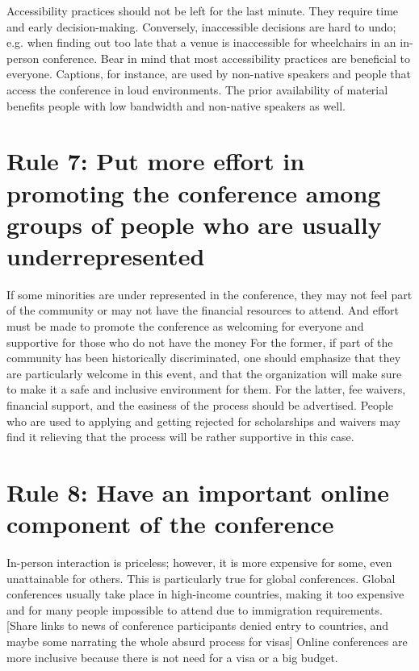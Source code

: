 \documentclass[10pt,letterpaper]{article}
\begin{document}
Accessibility practices should not be left for the last minute. They require time and early decision-making. Conversely, inaccessible decisions are hard to undo; e.g. when finding out too late that a venue is inaccessible for wheelchairs in an in-person conference. 
Bear in mind that most accessibility practices are beneficial to everyone. Captions, for instance, are used by non-native speakers and people that access the conference in loud environments. The prior availability of material benefits people with low bandwidth and non-native speakers as well.

\section*{Rule 7: Put more effort in promoting the conference among groups of people who are usually underrepresented}

If some minorities are under represented in the conference, they may not feel part of the community or may not have the financial resources to attend. And effort must be made to promote the conference as welcoming for everyone and supportive for those who do not have the money %
For the former, if part of the community has been historically discriminated, one should emphasize that they are particularly welcome in this event, and that the organization will make sure to make it a safe and inclusive environment for them. For the latter, fee waivers, financial support, and the easiness of the process should be advertised. People who are used to applying and getting rejected for scholarships and waivers may find it relieving that the process will be rather supportive in this case. 


\section*{Rule 8: Have an important online component of the conference} 

In-person interaction is priceless; however, it is more expensive for some, even unattainable for others. This is particularly true for global conferences. Global conferences usually take place in high-income countries, making it too expensive and for many people impossible to attend due to immigration requirements. [Share links to news of conference participants denied entry to countries, and maybe some narrating the whole absurd process for visas] Online conferences are more inclusive because there is not need for a visa or a big budget. 
\end{document}
